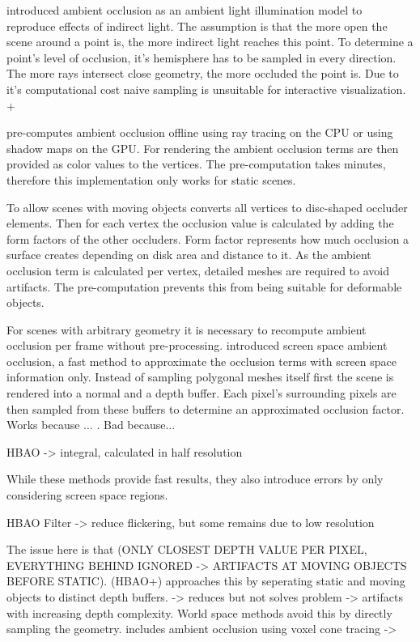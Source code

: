 \documentclass[hyperref,german,diplominf]{cgvpub}
\begin{document}
\cite{19} introduced ambient occlusion as an ambient light illumination model to reproduce effects of indirect light.
The assumption is that the more open the scene around a point is, the more indirect light reaches this point. To determine a point's level of occlusion, it's hemisphere has to be sampled in every direction. The more rays intersect close geometry, the more occluded the point is. Due to it's computational cost naive sampling is unsuitable for interactive visualization.
+ \cite{33}

\cite{21} pre-computes ambient occlusion offline using ray tracing on the CPU or using shadow maps on the GPU. For rendering the ambient occlusion terms are then provided as color values to the vertices. The pre-computation takes minutes, therefore this implementation only works for static scenes.

To allow scenes with moving objects \cite{22} converts all vertices to disc-shaped occluder elements. Then for each vertex the occlusion value is calculated by adding the form factors of the other occluders. Form factor represents how much occlusion a surface creates depending on disk area and distance to it. As the ambient occlusion term is calculated per vertex, detailed meshes are required to avoid artifacts. The pre-computation prevents this from being suitable for deformable objects.

For scenes with arbitrary geometry it is necessary to recompute ambient occlusion per frame without pre-processing. \cite{29} introduced screen space ambient occlusion, a fast method to approximate the occlusion terms with screen space information only. Instead of sampling polygonal meshes itself first the scene is rendered into a normal and a depth buffer. Each pixel's surrounding pixels are then sampled from these buffers to determine an approximated occlusion factor. Works because ... . Bad because...

\cite{30} HBAO -> integral, calculated in half resolution

While these methods provide fast results, they also introduce errors by only considering screen space regions.

\cite{31} HBAO Filter -> reduce flickering, but some remains due to low resolution

The issue here is that (ONLY CLOSEST DEPTH VALUE PER PIXEL, EVERYTHING BEHIND IGNORED -> ARTIFACTS AT MOVING OBJECTS BEFORE STATIC). \cite{32} (HBAO+) approaches this by seperating static and moving objects to distinct depth buffers. -> reduces but not solves problem -> artifacts with increasing depth complexity. World space methods avoid this by directly sampling the geometry. \cite{32} includes ambient occlusion using voxel cone tracing -> \cite{23} 
\end{document}
